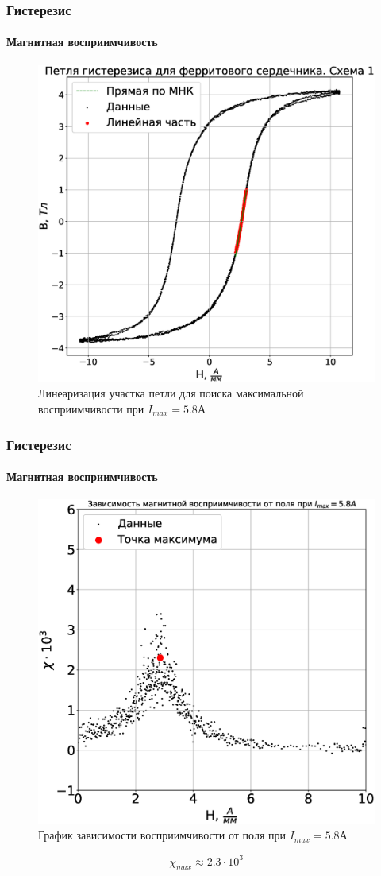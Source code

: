 \documentclass[8pt,pdf,hyperref={unicode}]{beamer}
\begin{document}
	\begin{frame}
		\frametitle{Гистерезис}
		\framesubtitle{Магнитная восприимчивость}
		\begin{center}
			\begin{figure}[h!]
				\centering
				\includegraphics[width=.5\linewidth]{Lab2_14.eps}
				\caption{Линеаризация участка петли для поиска максимальной восприимчивости при $I_{max} = 5.8$А}
				\label{fig:3}
			\end{figure}
		\end{center}
	\end{frame}

	\begin{frame}
		\frametitle{Гистерезис}
		\framesubtitle{Магнитная восприимчивость}
		\begin{center}
			\begin{figure}[h!]
				\centering
				\includegraphics[width=.45\linewidth]{Lab2_15.eps}
				\caption{График зависимости восприимчивости от поля при $I_{max} = 5.8$А}
				\label{fig:3}
			\end{figure}
		\begin{equation}
			\chi_{max} \approx 2.3 \cdot 10^3
		\end{equation}
		\end{center}
	\end{frame}
	
\end{document}
